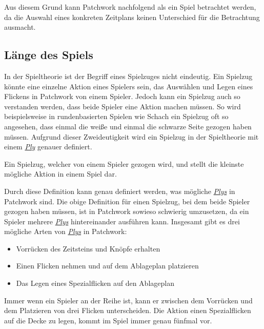Aus diesem Grund kann Patchwork nachfolgend als ein Spiel betrachtet werden, da die Auswahl eines konkreten Zeitplans keinen Unterschied für die Betrachtung ausmacht.

\subsection*{Länge des Spiels}
\label{subsection:analyse-laenge-des-spiels}

In der Spieltheorie ist der Begriff eines Spielzuges nicht eindeutig. Ein Spielzug könnte eine einzelne Aktion eines Spielers sein, \zB das Auswählen und Legen eines Flickens in Patchwork von einem Spieler. Jedoch kann ein Spielzug auch so verstanden werden, dass beide Spieler eine Aktion machen müssen. So wird beispielsweise in rundenbasierten Spielen wie Schach ein Spielzug oft so angesehen, dass einmal die weiße und einmal die schwarze Seite gezogen haben müssen. Aufgrund dieser Zweideutigkeit wird ein Spielzug in der Spieltheorie mit einem \hyperref[text:ply]{\emph{Ply}} genauer definiert.

\begin{defStrich}[Ply]
    Ein Spielzug, welcher von einem Spieler gezogen wird, und stellt die kleinste mögliche Aktion in einem Spiel dar. \cite[S. 213]{1959.GameTheoryStudiesCheckers}
\end{defStrich}
\label{text:ply}
\vspace{-0.2cm}

Durch diese Definition kann genau definiert werden, was mögliche \hyperref[text:ply]{\emph{Plys}} in Patchwork sind. Die obige Definition für einen Spielzug, bei dem beide Spieler gezogen haben müssen, ist in Patchwork sowieso schwierig umzusetzen, da ein Spieler mehrere \hyperref[text:ply]{\emph{Plys}} hintereinander ausführen kann. Insgesamt gibt es drei mögliche Arten von \hyperref[text:ply]{\emph{Plys}} in Patchwork:

\begin{itemize}
    \item Vorrücken des Zeitsteins und Knöpfe erhalten
    \item Einen Flicken nehmen und auf dem Ablageplan platzieren
    \item Das Legen eines Spezialflicken auf den Ablageplan
\end{itemize}

Immer wenn ein Spieler an der Reihe ist, kann er zwischen dem Vorrücken und dem Platzieren von drei Flicken unterscheiden. Die Aktion einen Spezialflicken auf die Decke zu legen, kommt im Spiel immer genau fünfmal vor.

